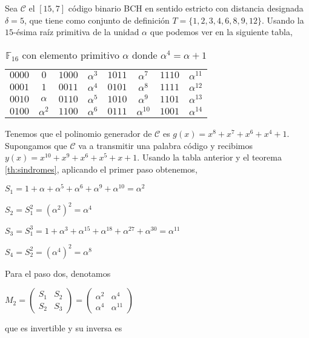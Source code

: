 \begin{exampleth}
\label{ex:algoritmo_pgz}
Sea $\mathcal{C}$ el $[15,7]$ código binario BCH en sentido estricto con distancia designada $\delta = 5$, que tiene como conjunto de definición $T = \{ 1,2,3,4,6,8,9,12 \}$. Usando la $15$-ésima raíz primitiva de la unidad $\alpha$ que podemos ver en la siguiente tabla,
\begin{table}[H]
\begin{tabular}{ c | c | c | c | c | c | c | c }

	 
$0000$ & $0$  & $1000$ & $\alpha^3$ & $1011$ & $\alpha^7$ & $1110$ & $\alpha^{11}$ \\$0001$ & $1$  & $0011$ & $\alpha^4$ & $0101$ & $\alpha^8$ & $1111$ & $\alpha^{12}$ \\
$0010$ & $\alpha$  & $0110$ & $\alpha^5$ & $1010$ & $\alpha^9$ & $1101$ & $\alpha^{13}$ \\
$0100$ & $\alpha^2$  & $1100$ & $\alpha^6$ & $0111$ & $\alpha^{10}$ & $1001$ & $\alpha^{14}$ \\
	\end{tabular}
\caption{$\mathbb{F}_{16}$ con elemento primitivo $\alpha$ donde $\alpha^4 = \alpha +1$}
\end{table}

Tenemos que el polinomio generador de $\mathcal{C}$ es $g(x) = x^8+x^7+x^6+x^4+1$.
Supongamos que $\mathcal{C}$ va a transmitir una palabra código y recibimos $y(x) = x^{10}+x^9+x^6+x^5+x+1$. Usando la tabla anterior y el teorema \ref{th:sindromes}, aplicando el primer paso obtenemos,

$S_1 = 1 + \alpha + \alpha^5 + \alpha^6 + \alpha^9 + \alpha^{10} = \alpha^2$  

$S_2 = S_1^2 = (\alpha^2)^2 = \alpha^4$

$S_3 = S_1^3 = 1 + \alpha^3 + \alpha^{15} + \alpha^{18} + \alpha^{27} + \alpha^{30} = \alpha^{11}$

$S_4 = S_2^2 = (\alpha^4)^2 = \alpha^8$

Para el paso dos, denotamos

$M_2 = \begin{pmatrix}
			S_1 & S_2  \\
			S_2 & S_3
	\end{pmatrix} = \begin{pmatrix}
			\alpha^2 & \alpha^4  \\
			\alpha^4 & \alpha^{11}
	\end{pmatrix}$

que es invertible y su inversa es 


\end{exampleth}
